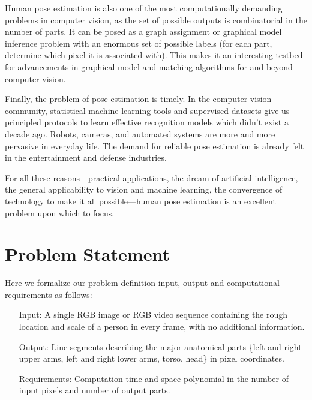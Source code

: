 Human pose estimation is also one of the most computationally demanding 
problems in computer vision, as the set of possible outputs is combinatorial in 
the number of parts.  It can be posed as a graph assignment or graphical model 
inference problem with an enormous set of possible labels (for each part, 
determine which pixel it is associated with).  This makes it an interesting 
testbed for advancements in graphical model and matching algorithms for and 
beyond computer vision.

Finally, the problem of pose estimation is timely.  In the computer vision 
community, statistical machine learning tools and supervised datasets give us 
principled protocols to learn effective recognition models which didn't exist a 
decade ago.  Robots, cameras, and automated systems are more and more pervasive 
in everyday life.  The demand for reliable pose estimation is already felt in 
the entertainment and defense industries. 

For all these reasons---practical applications, the dream of artificial 
intelligence, the general applicability to vision and machine learning, the 
convergence of technology to make it all possible---human pose estimation is an 
excellent problem upon which to focus.


\section{Problem Statement}

Here we formalize our problem definition input, output and computational 
requirements as follows:  

\begin{problem}
\label{prob:pose}
\hspace*{\fill}
\begin{itemize}
 \item[Input:] A single RGB image or RGB video sequence containing the rough 
location and scale of a person in every frame, with no additional information.
\item[Output:] Line segments describing the major anatomical parts \{left and 
right upper arms, left and right lower arms, torso, head\} in pixel 
coordinates.
\item[Requirements:] Computation time and space polynomial in the number of 
input pixels and number of output parts.
\end{itemize}
\end{problem}

